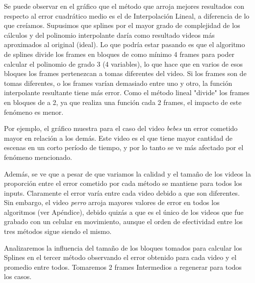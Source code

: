 \par Se puede observar en el gráfico que el método que arroja mejores resultados con respecto al error cuadrático medio es el de Interpolación Lineal, a diferencia de lo que creíamos. Supusimos que splines por el mayor grado de complejidad de los cálculos y del polinomio interpolante daría como resultado videos más aproximados al original (ideal). Lo que podría estar pasando es que el algoritmo de splines divide los frames en bloques de como mínimo 4 frames para poder calcular el polinomio de grado 3 (4 variables), lo que hace que en varios de esos bloques los frames pertenezcan a tomas diferentes del video. Si los frames son de tomas diferentes, o los frames varían demasiado entre uno y otro, la función interpolante resultante tiene más error. Como el método lineal "divide" los frames en bloques de a 2, ya que realiza una función cada 2 frames, el impacto de este fenómeno es menor.
\par Por ejemplo, el gráfico muestra para el caso del video \textit{bebes} un error cometido mayor en relación a los demás. Este video es el que tiene mayor cantidad de escenas en un corto período de tiempo, y por lo tanto se ve más afectado por el fenómeno mencionado.
\par Además, se ve que a pesar de que variamos la calidad y el tamaño de los videos la proporción entre el error cometido por cada método se mantiene para todos los inputs. Claramente el error varía entre cada video debido a que son diferentes. Sin embargo, el video \textit{perro} arroja mayores valores de error en todos los algoritmos (ver Apéndice), debido quizás a que es el único de los videos que fue grabado con un celular en movimiento, aunque el orden de efectividad entre los tres métodos sigue siendo el mismo.



\par Analizaremos la influencia del tamaño de los bloques tomados para calcular los Splines en el tercer método observando el error obtenido para cada video y el promedio entre todos. Tomaremos 2 frames Intermedios a regenerar para todos los casos.

